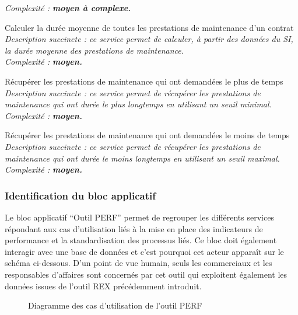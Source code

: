 \begin{description}
        \it{Complexité :} \bf{moyen} à \bf{complexe}.
    \item[\textbullet] Calculer la durée moyenne de toutes les prestations de maintenance d’un contrat \\
        \it{Description succincte :} ce service permet de calculer, à partir des données du SI, la durée moyenne des prestations de maintenance. \\
        \it{Complexité :} \bf{moyen}.
    \item[\textbullet] Récupérer les prestations de maintenance qui ont demandées le plus de temps \\
        \it{Description succincte :} ce service permet de récupérer les prestations de maintenance qui ont durée le plus longtemps en utilisant un seuil minimal. \\
        \it{Complexité :} \bf{moyen}.
    \item[\textbullet] Récupérer les prestations de maintenance qui ont demandées le moins de temps \\
        \it{Description succincte :} ce service permet de récupérer les prestations de maintenance qui ont durée le moins longtemps en utilisant un seuil maximal. \\
        \it{Complexité :} \bf{moyen}.
\end{description}

\subsubsection{Identification du bloc applicatif}

Le bloc applicatif “Outil PERF” permet de regrouper les différents services répondant aux cas d’utilisation liés à la mise en place des indicateurs de performance et la standardisation des processus liés. Ce bloc doit également interagir avec une base de données et c’est pourquoi cet acteur apparaît sur le schéma ci-dessous. D’un point de vue humain, seuls les commerciaux et les responsables d’affaires sont concernés par cet outil qui exploitent également les données issues de l’outil REX précédemment introduit.

\begin{figure}[H]
    \label{fig-uc-perf}
    \noindent{}
    \caption{Diagramme des cas d'utilisation de l'outil PERF}
\end{figure}

